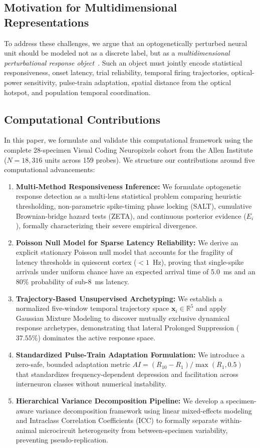 \documentclass[10pt,journal,compsoc]{IEEEtran}
\begin{document}
\subsection{Motivation for Multidimensional Representations}
To address these challenges, we argue that an optogenetically perturbed neural unit should be modeled not as a discrete label, but as a \textit{multidimensional perturbational response object}~\cite{stringer2019high}. Such an object must jointly encode statistical responsiveness, onset latency, trial reliability, temporal firing trajectories, optical-power sensitivity, pulse-train adaptation, spatial distance from the optical hotspot, and population temporal coordination.

\subsection{Computational Contributions}
In this paper, we formulate and validate this computational framework using the complete 28-specimen Visual Coding Neuropixels cohort from the Allen Institute ($N=18,316$ units across 159 probes). We structure our contributions around five computational advancements:
\begin{enumerate}
    \item \textbf{Multi-Method Responsiveness Inference:} We formulate optogenetic response detection as a multi-lens statistical problem comparing heuristic thresholding, non-parametric spike-timing phase locking (SALT), cumulative Brownian-bridge hazard tests (ZETA), and continuous posterior evidence ($E_i$), formally characterizing their severe empirical divergence.
    \item \textbf{Poisson Null Model for Sparse Latency Reliability:} We derive an explicit stationary Poisson null model that accounts for the fragility of latency thresholds in quiescent cortex ($<1$~Hz), proving that single-spike arrivals under uniform chance have an expected arrival time of 5.0~ms and an 80\% probability of sub-8~ms latency.
    \item \textbf{Trajectory-Based Unsupervised Archetyping:} We establish a normalized five-window temporal trajectory space $\mathbf{x}_i \in \mathbb{R}^5$ and apply Gaussian Mixture Modeling to discover mutually exclusive dynamical response archetypes, demonstrating that lateral Prolonged Suppression ($37.55\%$) dominates the active response space.
    \item \textbf{Standardized Pulse-Train Adaptation Formulation:} We introduce a zero-safe, bounded adaptation metric $AI = (R_{10} - R_1)/\max(R_1, 0.5)$ that standardizes frequency-dependent depression and facilitation across interneuron classes without numerical instability.
    \item \textbf{Hierarchical Variance Decomposition Pipeline:} We develop a specimen-aware variance decomposition framework using linear mixed-effects modeling and Intraclass Correlation Coefficients (ICC) to formally separate within-animal microcircuit heterogeneity from between-specimen variability, preventing pseudo-replication.
\end{enumerate}
\end{document}
